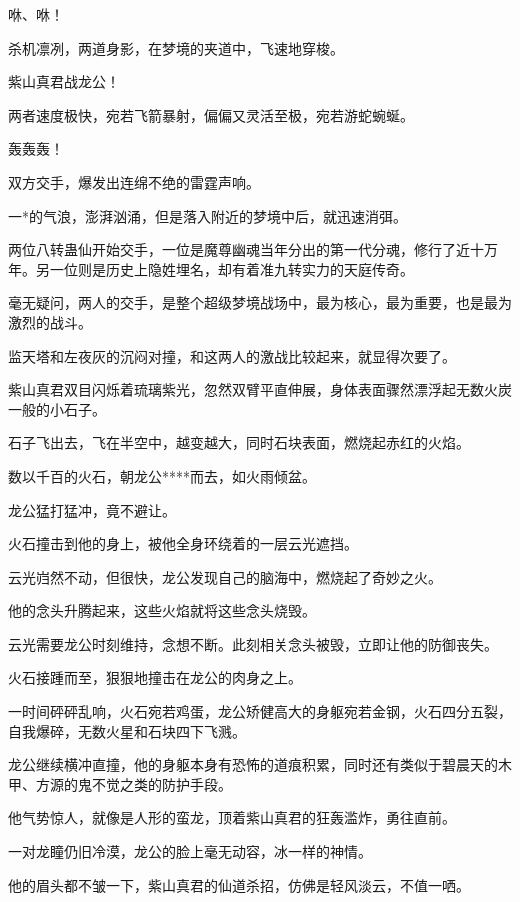 
\begin{this_body}

咻、咻！

杀机凛冽，两道身影，在梦境的夹道中，飞速地穿梭。

紫山真君战龙公！

两者速度极快，宛若飞箭暴射，偏偏又灵活至极，宛若游蛇蜿蜒。

轰轰轰！

双方交手，爆发出连绵不绝的雷霆声响。

一*的气浪，澎湃汹涌，但是落入附近的梦境中后，就迅速消弭。

两位八转蛊仙开始交手，一位是魔尊幽魂当年分出的第一代分魂，修行了近十万年。另一位则是历史上隐姓埋名，却有着准九转实力的天庭传奇。

毫无疑问，两人的交手，是整个超级梦境战场中，最为核心，最为重要，也是最为激烈的战斗。

监天塔和左夜灰的沉闷对撞，和这两人的激战比较起来，就显得次要了。

紫山真君双目闪烁着琉璃紫光，忽然双臂平直伸展，身体表面骤然漂浮起无数火炭一般的小石子。

石子飞出去，飞在半空中，越变越大，同时石块表面，燃烧起赤红的火焰。

数以千百的火石，朝龙公****而去，如火雨倾盆。

龙公猛打猛冲，竟不避让。

火石撞击到他的身上，被他全身环绕着的一层云光遮挡。

云光岿然不动，但很快，龙公发现自己的脑海中，燃烧起了奇妙之火。

他的念头升腾起来，这些火焰就将这些念头烧毁。

云光需要龙公时刻维持，念想不断。此刻相关念头被毁，立即让他的防御丧失。

火石接踵而至，狠狠地撞击在龙公的肉身之上。

一时间砰砰乱响，火石宛若鸡蛋，龙公矫健高大的身躯宛若金钢，火石四分五裂，自我爆碎，无数火星和石块四下飞溅。

龙公继续横冲直撞，他的身躯本身有恐怖的道痕积累，同时还有类似于碧晨天的木甲、方源的鬼不觉之类的防护手段。

他气势惊人，就像是人形的蛮龙，顶着紫山真君的狂轰滥炸，勇往直前。

一对龙瞳仍旧冷漠，龙公的脸上毫无动容，冰一样的神情。

他的眉头都不皱一下，紫山真君的仙道杀招，仿佛是轻风淡云，不值一哂。


\end{this_body}
